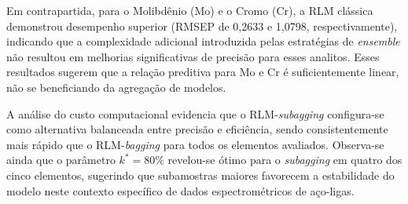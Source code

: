 Em contrapartida, para o Molibdênio (Mo) e o Cromo (Cr), a RLM 
clássica demonstrou desempenho superior (RMSEP de 0,2633 e 1,0798, 
respectivamente), indicando que a complexidade adicional introduzida 
pelas estratégias de \textit{ensemble} não resultou em melhorias 
significativas de precisão para esses analitos. Esses resultados 
sugerem que a relação preditiva para Mo e Cr é suficientemente linear, 
não se beneficiando da agregação de modelos.

A análise do custo computacional evidencia que o 
RLM-\textit{subagging} configura-se como alternativa balanceada entre 
precisão e eficiência, sendo consistentemente mais rápido que o 
RLM-\textit{bagging} para todos os elementos avaliados. Observa-se 
ainda que o parâmetro $k^* = 80\%$ revelou-se ótimo para o 
\textit{subagging} em quatro dos cinco elementos, sugerindo que 
subamostras maiores favorecem a estabilidade do modelo neste 
contexto específico de dados espectrométricos de aço-ligas.

%
%
%

